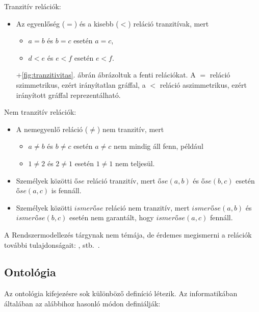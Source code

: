 \begin{pelda}

	Tranzitív relációk:
	\begin{itemize}
	\item Az egyenlőség ($=$) és a kisebb ($<$) reláció tranzitívak, mert
	\begin{itemize}
		\item $a = b$ és $b = c$ esetén $a = c$,
		\item $d < e$ és $e < f$ esetén $e < f$.
	\end{itemize}
	\Az+\ref{fig:tranzitivitas}. ábrán ábrázoltuk a fenti relációkat. A $=$ reláció szimmetrikus, ezért irányítatlan gráffal, a $<$ reláció aszimmetrikus, ezért irányított gráffal reprezentálható.
	\end{itemize}
	
	Nem tranzitív relációk:
	\begin{itemize}
	\item A nemegyenlő reláció ($\neq$) nem tranzitív, mert 
	\begin{itemize}
		\item $a \neq b$ és $b \neq c$ esetén $a \neq c$ nem mindig áll fenn, például
		\item $1 \neq 2$ és $2 \neq 1$ esetén $1 \neq 1$ nem teljesül.
	\end{itemize}
	\item Személyek közötti $\mathit{őse}$ reláció tranzitív, mert $\mathit{őse}(a, b)$ és $\mathit{őse}(b, c)$ esetén $\mathit{őse}(a, c)$ is fennáll. 
	\item Személyek közötti $\mathit{ismerőse}$ reláció nem tranzitív, mert $\mathit{ismerőse}(a, b)$ és $\mathit{ismerőse}(b, c)$ esetén nem garantált, hogy $\mathit{ismerőse}(a, c)$ fennáll.
	\end{itemize}
\end{pelda}


A Rendszermodellezés tárgynak nem témája, de érdemes megismerni a relációk további tulajdonságait: ,  stb.~\cite{wiki:relacio}. 

\subsection{Ontológia}

Az ontológia kifejezésre sok különböző definíció létezik. Az informatikában általában az alábbihoz hasonló módon definiálják:

